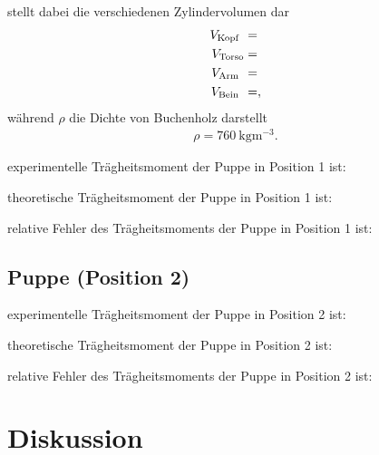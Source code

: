  stellt dabei die verschiedenen Zylindervolumen dar
\begin{subequations}
\begin{align}
 V_{\text{Kopf\hphantom{o}}} &= \\
 V_{\text{Torso}} &= \\
 V_{\text{Arm\hphantom{o}}} &= \\
 V_{\text{Bein\hphantom{o}}} &= ,
\end{align}
\end{subequations}
während $\rho$ die Dichte von Buchenholz darstellt \cite{Holzdichte}
\begin{align}
    \rho = \SI{760}{\kilo\gram\meter\tothe{-3}}.
\end{align}

\justifying experimentelle Trägheitsmoment der Puppe in Position 1 ist:


\justifying theoretische Trägheitsmoment der Puppe in Position 1 ist:


\justifying relative Fehler des Trägheitsmoments der Puppe in Position 1 ist:


\subsection{Puppe (Position 2)}\justifying %

\justifying experimentelle Trägheitsmoment der Puppe in Position 2 ist:


\justifying theoretische Trägheitsmoment der Puppe in Position 2 ist:


\justifying relative Fehler des Trägheitsmoments der Puppe in Position 2 ist:


\section{Diskussion}\justifying

\newpage

\printbibliography
